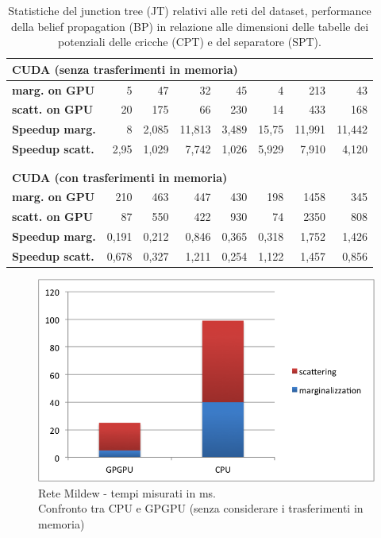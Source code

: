 \documentclass[a4paper]{article}   %
\begin{document}
\begin{table}
\begin{tabular}{ l | r | r | r | r | r | r | r }
\multicolumn{8}{l}{\textbf{CUDA (senza trasferimenti in memoria)}} \\
\hline
\textbf{marg. on GPU} &	5 &	47 &	32 &	45 &	4 &		213	& 43 \\
\hline
\textbf{scatt. on GPU} &	20 &	175 &	66 &	230 &	14	&	433 &	168 \\
\hline
\textbf{Speedup marg.} & 8 &	2,085 &	11,813 &	3,489 &	15,75	&	11,991 &	11,442 \\
\hline
\textbf{Speedup scatt.} & 2,95 &	1,029 &	7,742 &		1,026 &	5,929 &		7,910 &	4,120 \\
\multicolumn{8}{l}{ }	\\
\multicolumn{8}{l}{ }	\\								

\multicolumn{8}{l}{\textbf{CUDA (con trasferimenti in memoria)}} \\
\hline
\textbf{marg. on GPU} &	210 &	463	& 447 &	430 &	198 &		1458 &	345 \\
\hline
\textbf{scatt. on GPU} &	87	& 550 &	422	& 930 &	74 &		2350 &	808 \\
\hline
\textbf{Speedup marg.} & 0,191 &	0,212 &	0,846 &		0,365 &	0,318 &	1,752 &	1,426 \\
\hline
\textbf{Speedup scatt.} & 0,678 &	0,327 &	1,211 &	 0,254 & 	1,122	&	1,457 &	0,856 \\
\end{tabular}
\caption{Statistiche del junction tree (JT) relativi alle reti del dataset, performance della belief propagation (BP) in relazione alle dimensioni delle tabelle dei potenziali delle cricche (CPT) e del separatore (SPT).}
\label{tab:tempi}
\end{table}

\begin{figure}[p]
\centering
\includegraphics[scale=0.8]{Mildew.png}
\caption{Rete Mildew - tempi misurati in ms.\\Confronto tra CPU e GPGPU (senza considerare i trasferimenti in memoria)} 
\label{graficoMildew}
\end{figure}
\end{document}
